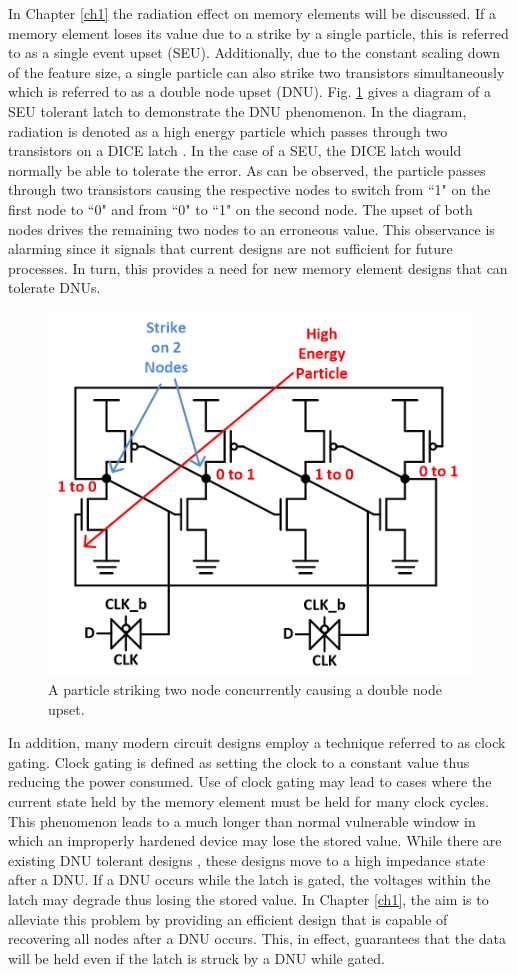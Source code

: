 In Chapter \ref{ch1} the radiation effect on memory elements will be discussed. If a memory element loses its value due to a strike by a single particle, this is referred to as a single event upset (SEU). Additionally, due to the constant scaling down of the feature size, a single particle can also strike two transistors simultaneously which is referred to as a double node upset (DNU). Fig. \ref{DNUStrike} gives a diagram of a SEU tolerant latch to demonstrate the DNU phenomenon. In the diagram, radiation is denoted as a high energy particle which passes through two transistors on a DICE latch \cite{DICE}. In the case of a SEU, the DICE latch would normally be able to tolerate the error. As can be observed, the particle passes through two transistors causing the respective nodes to switch from ``1" on the first node to ``0" and from ``0" to ``1" on the second node. The upset of both nodes drives the remaining two nodes to an erroneous value. This observance is alarming since it signals that current designs are not sufficient for future processes. In turn, this provides a need for new memory element designs that can tolerate DNUs. 

\begin{figure}[!htbp]
	\centering
	\includegraphics[width=0.45\linewidth]{Figures/StrikeonDICE}
	\caption{A particle striking two node concurrently causing a double node upset.}
	\label{DNUStrike}
\end{figure} 

In addition, many modern circuit designs employ a technique referred to as clock gating. Clock gating is defined as setting the clock to a constant value thus reducing the power consumed. Use of clock gating may lead to cases where the current state held by the memory element must be held for many clock cycles. This phenomenon leads to a much longer than normal vulnerable window in which an improperly hardened device may lose the stored value. While there are existing DNU tolerant designs \cite{Inter,DNCS,HSMUF}, these designs move to a high impedance state after a DNU. If a DNU occurs while the latch is gated, the voltages within the latch may degrade thus losing the stored value. In Chapter \ref{ch1}, the aim is to alleviate this problem by providing an efficient design that is capable of recovering all nodes after a DNU occurs. This, in effect, guarantees that the data will be held even if the latch is struck by a DNU while gated.

